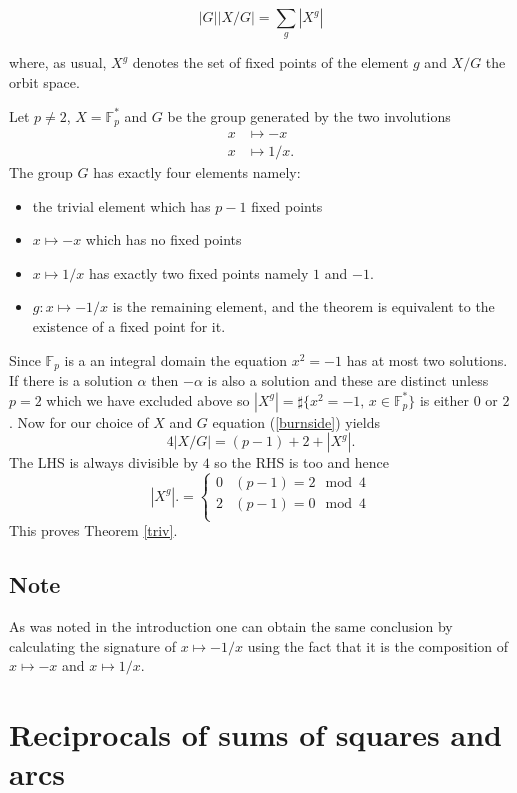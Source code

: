 \documentclass[12pt,a4paper]{amsart}
\def\fp{\mathbb{F}_p}
\begin{document}
\begin{equation}\label{class formula}
|G| |X/G| = \sum_{g} |X^g| 
\end{equation}  

where, as usual, 
 $X^g$ denotes the set of fixed points of the element $g$ 
 and $X/G$  the orbit space.


Let $p \neq 2$,  $X = \fp^*$ and $G$ be the group generated by the two involutions
\begin{eqnarray*}
x & \mapsto -x \\
x & \mapsto 1/x.
\end{eqnarray*}
The group  $G$ has exactly four elements namely:
\begin{itemize}
\item the trivial element which has  $p-1$ fixed points
\item $x\mapsto -x$ which has no fixed points 
\item  $x\mapsto 1/x$ has exactly two fixed points namely $1$ and $-1$.
\item  $g:x \mapsto -1/x$ is the remaining element, and the theorem is equivalent to the existence of a fixed point for it.
\end{itemize}
Since $\fp$ is a an integral domain the equation $x^2 = -1$ has at
most two solutions. If there is a solution $\alpha$ then $-\alpha$
is also a solution and these are distinct unless $p=2$ which we have
excluded above so
$|X^g| = \sharp \{x^2 = -1, \, x\in \fp^* \}$
is either $0$ or $2$.
Now for our choice of $X$ and $G$ equation (\ref{burnside}) yields
\begin{equation}
4 |X/G|   = (p-1) + 2 + |X^g|.
\end{equation}  
The LHS is always divisible by $4$ so the  RHS is too and
hence
$$ |X^g|. = \left\{  \begin{array}{ll}
0 & (p-1) =  2 \mod 4 \\
2 & (p-1) =  0 \mod 4 \\
\end{array}
\right.
$$
This proves Theorem \ref{triv}.

\subsection*{Note}
As was noted in the introduction one can obtain the same conclusion 
by calculating the signature of $x\mapsto -1/x$ 
using the fact that it is  the composition of
$x \mapsto -x$ and $x \mapsto 1/x$.


\section{Reciprocals of sums of squares and arcs}
\end{document}
